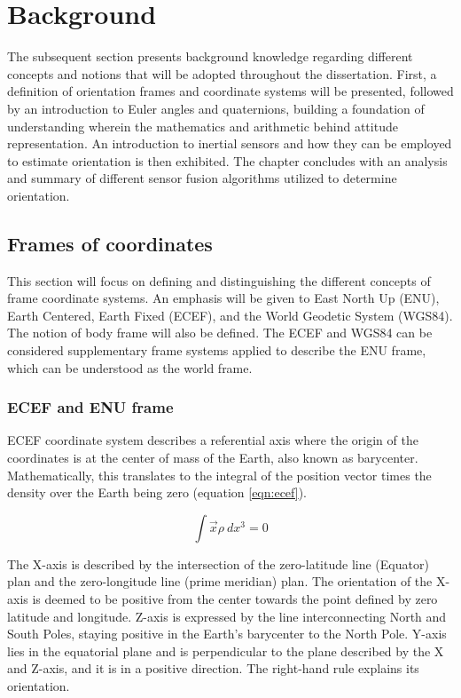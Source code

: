 \section{Background}

The subsequent section presents background knowledge regarding different concepts and notions that will be adopted throughout the dissertation.
First, a definition of orientation frames and coordinate systems will be presented, followed by an introduction to Euler angles and quaternions, building a foundation of understanding wherein the mathematics and arithmetic behind attitude representation. An introduction to inertial sensors and how they can be employed to estimate orientation is then exhibited. The chapter concludes with an analysis and summary of different sensor fusion algorithms utilized to determine orientation.

\subsection{Frames of coordinates}

This section will focus on defining and distinguishing the different concepts of frame coordinate systems. An emphasis will be given to East North Up (ENU), Earth Centered, Earth Fixed (ECEF), and the World Geodetic System (WGS84). The notion of body frame will also be defined. The ECEF and WGS84 can be considered supplementary frame systems applied to describe the ENU frame, which can be understood as the world frame.

\subsubsection{ECEF and ENU frame}

ECEF coordinate system describes a referential axis where the origin of the coordinates is at the center of mass of the Earth, also known as barycenter. Mathematically, this translates to the integral of the position vector times the density over the Earth being zero (equation \ref{eqn:ecef}).

\begin{equation}
    \int \overrightarrow{x}\rho~dx^3 = 0
    \label{eqn:ecef}
\end{equation}

The X-axis is described by the intersection of the zero-latitude line (Equator) plan and the zero-longitude line (prime meridian) plan. The orientation of the X-axis is deemed to be positive from the center towards the point defined by zero latitude and longitude. Z-axis is expressed by the line interconnecting North and South Poles, staying positive in the Earth’s barycenter to the North Pole. Y-axis lies in the equatorial plane and is perpendicular to the plane described by the X and Z-axis, and it is in a positive direction.  The right-hand rule explains its orientation.

